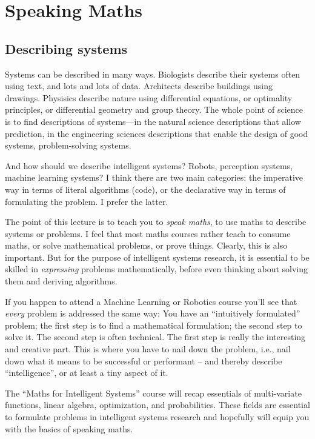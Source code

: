 {\small\tableofcontents}

\section{Speaking Maths}

\subsection{Describing systems}

Systems can be described in many ways. Biologists describe their
systems often using text, and lots and lots of data. Architects
describe buildings using drawings. Physisics describe nature using
differential equations, or optimality principles, or differential
geometry and group theory. The whole point of science is to find
descriptions of systems---in the natural science descriptions that
allow prediction, in the engineering sciences descriptions
that enable the design of good systems, problem-solving systems.

And how should we describe intelligent systems? Robots, perception
systems, machine learning systems? I think there are two main categories:
the imperative way in terms of literal algorithms (code), or the
declarative way in terms of formulating the problem. I prefer the latter.

The point of this lecture is to teach you to \emph{speak maths}, to
use maths to describe systems or problems. I feel that most maths
courses rather teach to consume maths, or solve mathematical problems,
or prove things. Clearly, this is also important. But for the purpose
of intelligent systems research, it is essential to be skilled
in \emph{expressing} problems mathematically, before even thinking
about solving them and deriving algorithms.

If you happen to attend a Machine Learning or Robotics course you'll
see that \emph{every} problem is addressed the same way: You have an
``intuitively formulated'' problem; the first step is to find a
mathematical formulation; the second step to solve it. The second step
is often technical. The first step is really the interesting and
creative part. This is where you have to nail down the problem, i.e.,
nail down what it means to be successful or performant -- and
thereby describe ``intelligence'', or at least a tiny aspect of it.

The ``Maths for Intelligent Systems'' course will recap essentials of
multi-variate functions, linear algebra, optimization, and probabilities. These
fields are essential to formulate problems in intelligent
systems research and hopefully will equip you with the basics of
speaking maths.

